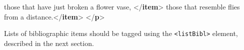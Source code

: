 \documentclass[11pt,twoside]{article}\makeatletter
\begin{document}
\begin{shaded}
\hspace*{6pt} those that have just broken a flower\mbox{}\newline 
\hspace*{6pt}\hspace*{6pt}\hspace*{6pt}\hspace*{6pt} vase, {</\textbf{item}>}\mbox{}\newline 
\hspace*{6pt} those that resemble flies from a\mbox{}\newline 
\hspace*{6pt}\hspace*{6pt}\hspace*{6pt}\hspace*{6pt} distance.{</\textbf{item}>}\mbox{}\newline 
{}\mbox{}\newline 
{</\textbf{p}>}\end{shaded}\egroup\par \par
Lists of bibliographic items should be tagged using the \texttt{<listBibl>} element, described in the next section.
\end{document}
